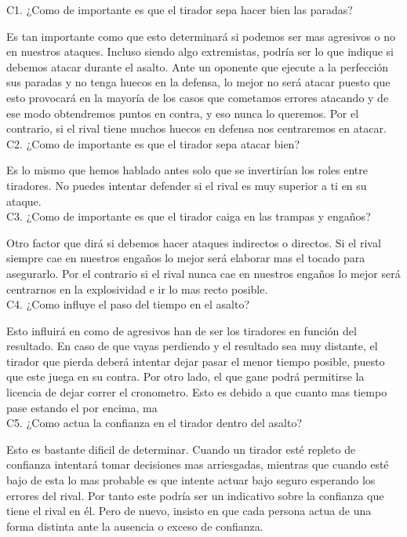 C1. ¿Como de importante es que el tirador sepa hacer bien las paradas?

Es tan importante como que esto determinará si podemos ser mas agresivos o no en nuestros ataques.
Incluso siendo algo extremistas, podría ser lo que indique si debemos atacar durante el asalto.
Ante un oponente que ejecute a la perfección sus paradas y no tenga huecos en la defensa, lo mejor
no será atacar puesto que esto provocará en la mayoría de los casos que cometamos errores atacando
y de ese modo obtendremos puntos en contra, y eso nunca lo queremos. Por el contrario, si el rival
tiene muchos huecos en defensa nos centraremos en atacar.
\\

C2. ¿Como de importante es que el tirador sepa atacar bien?

Es lo mismo que hemos hablado antes solo que se invertirían los roles entre tiradores. No puedes
intentar defender si el rival es muy superior a ti en su ataque.
\\

C3. ¿Como de importante es que el tirador caiga en las trampas y engaños?

Otro factor que dirá si debemos hacer ataques indirectos o directos. Si el rival siempre cae en
nuestros engaños lo mejor será elaborar mas el tocado para asegurarlo. Por el contrario si el
rival nunca cae en nuestros engaños lo mejor será centrarnos en la explosividad e ir lo mas recto
posible.
\\

C4. ¿Como influye el paso del tiempo en el asalto?

Esto influirá en como de agresivos han de ser los tiradores en función del resultado. En caso de
que vayas perdiendo y el resultado sea muy distante, el tirador que pierda deberá intentar dejar
pasar el menor tiempo posible, puesto que este juega en su contra. Por otro lado, el que gane
podrá permitirse la licencia de dejar correr el cronometro. Esto es debido a que cuanto mas tiempo pase
estando el por encima, ma
\\

C5. ¿Como actua la confianza en el tirador dentro del asalto?

Esto es bastante dificil de determinar. Cuando un tirador esté repleto de confianza intentará
tomar decisiones mas arriesgadas, mientras que cuando esté bajo de esta lo mas probable es que
intente actuar bajo seguro esperando los errores del rival. Por tanto este podría ser un
indicativo sobre la confianza que tiene el rival en él. Pero de nuevo, insisto en que cada
persona actua de una forma distinta ante la ausencia o exceso de confianza.
\\

